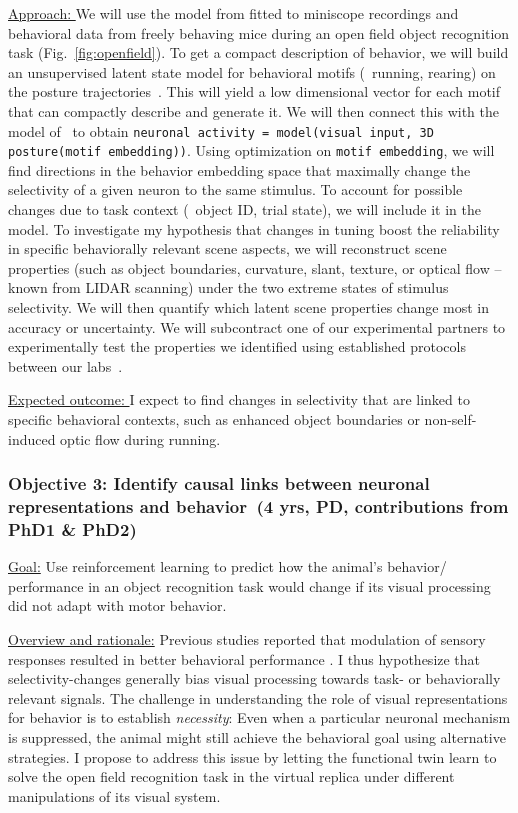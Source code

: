 \documentclass[COG,11pt]{ercgrant}
\begin{document}
\underline{Approach: } 
We will use the model from  fitted to miniscope recordings and behavioral data from freely behaving mice during an open field object recognition task (Fig.~\ref{fig:openfield}).
To get a compact description of behavior, we will build an unsupervised latent state model for behavioral motifs (\eg~running, rearing) on the posture trajectories~\parencite[similar to][]{Wiltschko2015-ey, Wiltschko2020-zd}.
This will yield a low dimensional vector for each motif that can compactly describe and generate it. 
We will then connect this with the model of~ to obtain \texttt{neuronal activity = model(visual input, 3D posture(motif embedding))}. 
Using optimization on \texttt{motif embedding}, we will find directions in the behavior embedding space that maximally change the selectivity of a given neuron to the same stimulus.
To account for possible changes due to task context (\eg~object ID, trial state), we will include it  in the model.
To investigate my hypothesis that changes in tuning boost the reliability in specific behaviorally relevant scene aspects, we will reconstruct scene properties (such as object boundaries, curvature, slant, texture, or optical flow -- known from LIDAR scanning) under the two extreme states of stimulus selectivity. 
We will then quantify which latent scene properties change most in accuracy or uncertainty.
We will subcontract one of our experimental partners to experimentally test the properties we identified using established protocols between our labs~\parencite[used in \eg][]{Walker2019-yw, Franke2022-do}.

\underline{Expected outcome: } I expect to find changes in selectivity that are linked to specific behavioral contexts, such as enhanced object boundaries or non-self-induced optic flow during running.


\subsubsection{Objective 3: Identify causal links between neuronal representations and behavior~(4 yrs, PD, contributions from PhD1 \& PhD2)\hfill{}}
\underline{Goal:} Use reinforcement learning to predict how the animal's behavior/ performance in an object recognition task would change if its visual processing did not adapt with motor behavior.

\underline{Overview and rationale:} 
Previous studies reported that modulation of sensory responses resulted in better behavioral performance \parencite{Spitzer1988-kq, Bennett2013-rk, Dadarlat2017-jw, De_Gee2022-ir}.
I thus hypothesize that selectivity-changes generally bias visual processing towards task- or behaviorally relevant signals.
The challenge in understanding the role of visual representations for behavior is to establish \textit{necessity}: Even when a particular neuronal mechanism is suppressed, the animal might still achieve the behavioral goal using alternative strategies. 
I propose to address this issue by letting the functional twin learn to solve the open field recognition task in the virtual replica under different manipulations of its visual system.  
\end{document}
